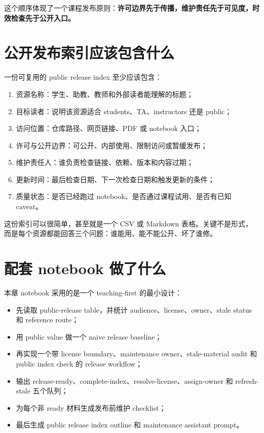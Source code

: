 这个顺序体现了一个课程发布原则：\textbf{许可边界先于传播，维护责任先于可见度，时效检查先于公开入口。}

\section{公开发布索引应该包含什么}

一份可复用的 public release index 至少应该包含：

\begin{enumerate}
    \item 资源名称：学生、助教、教师和外部读者能理解的标题；
    \item 目标读者：说明该资源适合 students、TA、instructors 还是 public；
    \item 访问位置：仓库路径、网页链接、PDF 或 notebook 入口；
    \item 许可与公开边界：可公开、内部使用、限制访问或暂缓发布；
    \item 维护责任人：谁负责检查链接、依赖、版本和内容过期；
    \item 更新时间：最后检查日期、下一次检查日期和触发更新的条件；
    \item 质量状态：是否已经跑过 notebook、是否通过课程试用、是否有已知 caveat。
\end{enumerate}

这份索引可以很简单，甚至就是一个 CSV 或 Markdown 表格。关键不是形式，而是每个资源都能回答三个问题：谁能用、能不能公开、坏了谁修。

\section{配套 notebook 做了什么}

本章 notebook 采用的是一个 teaching-first 的最小设计：

\begin{itemize}
    \item 先读取 public-release table，并统计 audience、license、owner、stale status 和 reference route；
    \item 用 public value 做一个 naive release baseline；
    \item 再实现一个带 license boundary、maintenance owner、stale-material audit 和 public index check 的 release workflow；
    \item 输出 release-ready、complete-index、resolve-license、assign-owner 和 refresh-stale 五个队列；
    \item 为每个非 ready 材料生成发布前维护 checklist；
    \item 最后生成 public release index outline 和 maintenance assistant prompt。
\end{itemize}

